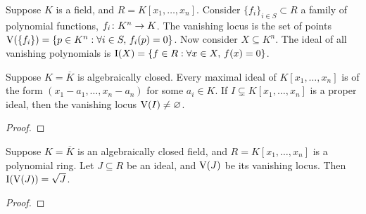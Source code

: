 \begin{definition}
    Suppose \(K\) is a field, and \(R = K[x_1,\hdots,x_n]\).
    Consider \({\{f_i\}}_{i \in S} \subset R\) a family of polynomial functions,
    \(f_i\colon K^n\to K\).
    The vanishing locus is the set of points
    \(\operatorname{V}(\{f_i\}) = \{p \in K^n: \forall i \in S,\,f_i(p) = 0\}\).
    Now consider \(X \subseteq K^n\).
    The ideal of all vanishing polynomials is
    \(\operatorname{I}(X) = \{f \in R: \forall x \in X,\,f(x) = 0\}\).
\end{definition}
\begin{corollary}
    Suppose \(K = \overline{K}\) is algebraically closed.
    Every maximal ideal of \(K[x_1,\hdots,x_n]\) is of the form
    \((x_1-a_1,\hdots,x_n-a_n)\) for some \(a_i \in K\).
    If \(I \subsetneq K[x_1,\hdots,x_n]\) is a proper ideal,
    then the vanishing locus \(\operatorname{V}(I) \neq \varnothing\).
\end{corollary}
\begin{proof}
    
\end{proof}
\begin{theorem}\label{thm:nullstellensatz}
    Suppose \(K = \overline{K}\) is an algebraically closed field,
    and \(R = K[x_1,\hdots,x_n]\) is a polynomial ring.
    Let \(J \subseteq R\) be an ideal, and \(\operatorname{V}(J)\) be its vanishing locus.
    Then \(\operatorname{I}(\operatorname{V}(J)) = \sqrt{J}\).
\end{theorem}
\begin{proof}
    
\end{proof}


